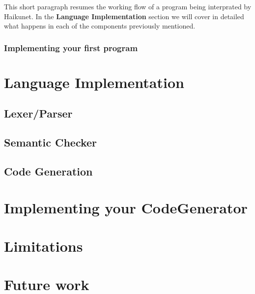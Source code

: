 This short paragraph resumes the working flow of a program being interprated by Haikunet. In the \textbf{Language Implementation} section we will cover in detailed what happens in each of the components previously mentioned.\\

\subsubsection{Implementing your first program}

\section{Language Implementation}

\subsection{Lexer/Parser}

\subsection{Semantic Checker}

\subsection{Code Generation}

\section{Implementing your CodeGenerator}

\section{Limitations}

\section{Future work}